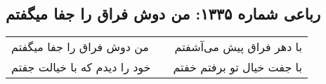 \begin{center}
\section*{رباعی شماره ۱۳۳۵: من دوش فراق را جفا میگفتم}
\label{sec:1335}
\begin{longtable}{l p{0.5cm} r}
من دوش فراق را جفا میگفتم
&&
با دهر فراق پیش می‌آشفتم
\\
خود را دیدم که با خیالت جفتم
&&
با جفت خیال تو برفتم خفتم
\\
\end{longtable}
\end{center}
